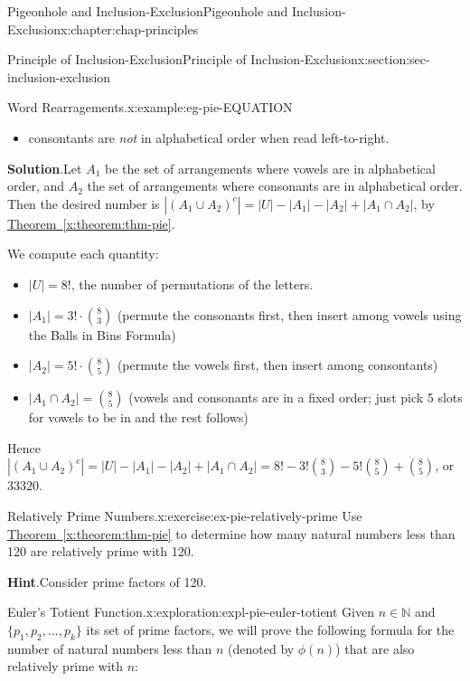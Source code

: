 \documentclass[oneside,10pt,]{book}
\newcommand{\blocktitlefont}{\relax}
\newcommand{\xreffont}{\relax}
\numberwithin{equation}{section}
\begin{document}
\begin{chapterptx}{Pigeonhole and Inclusion-Exclusion}{}{Pigeonhole and Inclusion-Exclusion}{}{}{x:chapter:chap-principles}
\begin{sectionptx}{Principle of Inclusion-Exclusion}{}{Principle of Inclusion-Exclusion}{}{}{x:section:sec-inclusion-exclusion}
\begin{example}{Word Rearragements.}{x:example:eg-pie-EQUATION}
\begin{itemize}[label=\textbullet]
\item{}consontants are \emph{not} in alphabetical order when read left-to-right.%
\end{itemize}
%
\par\smallskip%
\noindent\textbf{\blocktitlefont Solution}.\hypertarget{g:solution:id434539}{}\quad{}Let \(A_1\) be the set of arrangements where vowels are in alphabetical order, and \(A_2\) the set of arrangements where consonants are in alphabetical order. Then the desired number is \(|(A_1 \cup A_2)^c| = |U| - |A_1| - |A_2| + |A_1 \cap A_2|\), by \hyperref[x:theorem:thm-pie]{Theorem~{\xreffont\ref{x:theorem:thm-pie}}}.%
\par
We compute each quantity:%
\begin{itemize}[label=\textbullet]
\item{}\(|U| = 8!\), the number of permutations of the letters.%
\item{}\(|A_1| = 3! \cdot \binom{8}{3}\) (permute the consonants first, then insert among vowels using the Balls in Bins Formula)%
\item{}\(|A_2| = 5! \cdot \binom{8}{5}\) (permute the vowels first, then insert among consontants)%
\item{}\(|A_1 \cap A_2| = \binom{8}{5}\) (vowels and consonants are in a fixed order; just pick 5 slots for vowels to be in and the rest follows)%
\end{itemize}
%
\par
Hence \(|(A_1 \cup A_2)^c| = |U| - |A_1| - |A_2| + |A_1 \cap A_2| = 8! - 3!\binom{8}{3} - 5!\binom{8}{5} + \binom{8}{5}\), or 33320.%
\end{example}
\begin{inlineexercise}{Relatively Prime Numbers.}{x:exercise:ex-pie-relatively-prime}%
Use \hyperref[x:theorem:thm-pie]{Theorem~{\xreffont\ref{x:theorem:thm-pie}}} to determine how many natural numbers less than 120 are relatively prime with 120.%
\par\smallskip%
\noindent\textbf{\blocktitlefont Hint}.\hypertarget{g:hint:id434758}{}\quad{}Consider prime factors of 120.%
\end{inlineexercise}
\begin{exploration}{Euler's Totient Function.}{x:exploration:expl-pie-euler-totient}%
Given \(n \in \mathbb{N}\) and \(\{p_1,p_2,\ldots,p_k\}\) its set of prime factors, we will prove the following formula for the number of natural numbers less than \(n\) (denoted by \(\phi(n)\)) that are also relatively prime with \(n\):%
\begin{equation*}

\end{equation*}
\end{exploration}
\end{sectionptx}
\end{chapterptx}
\end{document}
